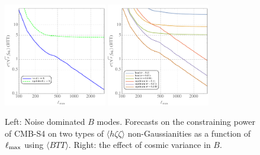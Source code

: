 \begin{figure}[ht]
\centering
\includegraphics[width=0.4\textwidth]{Inflation/DeltaFNL_BTT_no_r}
\includegraphics[width=0.4\textwidth]{Inflation/DeltaFNL_BTT_with_r}
\caption{Left: Noise dominated $B$ modes. Forecasts on the constraining power of CMB-S4 on two types of $\langle h \zeta \zeta\rangle$ non-Gaussianities as a function of $\ell_{\rm max}$ using $\langle BTT\rangle$. Right: the effect of cosmic variance in $B$.  }
\label{fig_fnlforecastBTT}
\end{figure}


 
